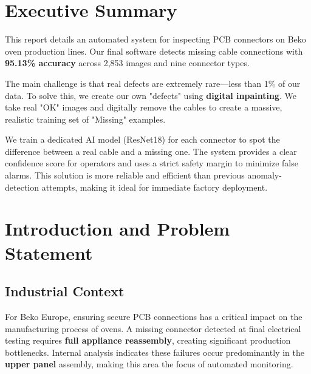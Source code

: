 \documentclass[11pt,a4paper]{article}
\begin{document}
\newpage

\tableofcontents
\newpage


\section{Executive Summary}

This report details an automated system for inspecting PCB connectors on Beko oven production lines. Our final software detects missing cable connections with \textbf{95.13\% accuracy} across 2,853 images and nine connector types.

The main challenge is that real defects are extremely rare---less than 1\% of our data. To solve this, we create our own "defects" using \textbf{digital inpainting}. We take real "OK" images and digitally remove the cables to create a massive, realistic training set of "Missing" examples.

We train a dedicated AI model (ResNet18) for each connector to spot the difference between a real cable and a missing one. The system provides a clear confidence score for operators and uses a strict safety margin to minimize false alarms. This solution is more reliable and efficient than previous anomaly-detection attempts, making it ideal for immediate factory deployment.

\section{Introduction and Problem Statement}

\subsection{Industrial Context}

For Beko Europe, ensuring secure PCB connections has a critical impact on the manufacturing process of ovens. A missing connector detected at final electrical testing requires \textbf{full appliance reassembly}, creating significant production bottlenecks. Internal analysis indicates these failures occur predominantly in the \textbf{upper panel} assembly, making this area the focus of automated monitoring.
\end{document}
